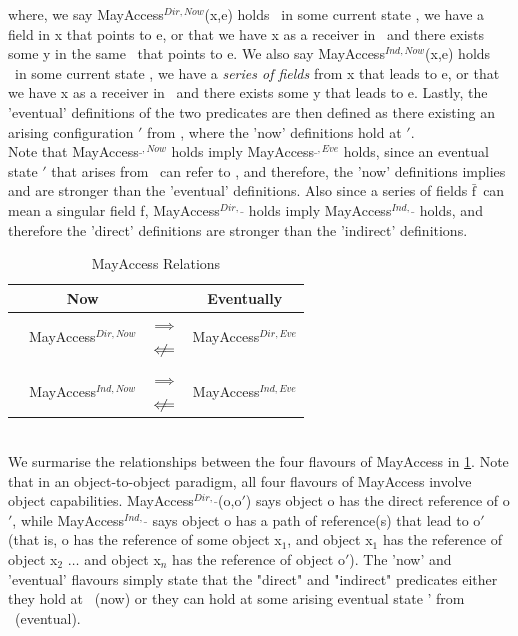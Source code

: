 \documentclass[a4paper,11pt,twoside]{article}
\newcommand*\rot{\rotatebox{90}}
\newcommand{\loimplies}{$\implies$}
\newcommand{\lonimplies}{$\centernot\implies$}
\newcommand{\loimpliedby}{$\Longleftarrow$}
\newcommand{\lonimpliedby}{$\centernot\Longleftarrow$}
\newcommand{\losigma}{\text{$\upsigma$}}
\newcommand{\loconj}[1] {$\bar{\text{#1}}$}
\newcommand{\lotiff} {\textit{\textls[-20]{iff}}}
\begin{document}
where, we say MayAccess$^{Dir,Now}$(x,e) holds \lotiff\ in some current state \losigma, we have a field in x that points to e, or that we have x as a receiver in \losigma\ and there exists some y in the same \losigma\ that points to e. We also say MayAccess$^{Ind,Now}$(x,e) holds \lotiff\ in some current state \losigma, we have a \textit{series of fields} from x that leads to e, or that we have x as a receiver in \losigma\ and there exists some y that leads to e. Lastly, the 'eventual' definitions of the two predicates are then defined as there existing an arising configuration \losigma$'$ from \losigma, where the 'now' definitions hold at \losigma$'$.\\

Note that MayAccess$^{\_,Now}$ holds imply MayAccess$^{\_,Eve}$ holds, since an eventual state \losigma$'$ that arises from \losigma\, can refer to \losigma, and therefore, the 'now' definitions implies and are stronger than the 'eventual' definitions. Also since a series of fields \loconj{f}\ can mean a singular field f, MayAccess$^{Dir,\_}$ holds imply MayAccess$^{Ind,\_}$ holds, and therefore the 'direct' definitions are stronger than the 'indirect' definitions. \\
\begin{table}[htb]
\caption{MayAccess Relations}\label{tab:accessrelations}
\centering
\begin{tabular*}{0.5\linewidth}{c|ccc}\toprule
& \bf Now & & \bf Eventually\\
\hline
\multirow{5}{*}{\rot{\bf Indirect \enspace Direct \:}} & \multirow{2}{*}{MayAccess$^{Dir,Now}$} & \loimplies & \multirow{2}{*}{MayAccess$^{Dir, Eve}$} \\
& & \lonimpliedby &  \\
& \rot{\loimpliedby} \rot{\lonimplies}& &\rot{\loimpliedby} \rot{\lonimplies} \\
& \multirow{2}{*}{MayAccess$^{Ind,Now}$} & \loimplies & \multirow{2}{*}{MayAccess$^{Ind, Eve}$} \\
& & \lonimpliedby &\\
\end{tabular*}
\end{table}\\
We surmarise the relationships between the four flavours of MayAccess in \cref{tab:accessrelations}. Note that in an object-to-object paradigm, all four flavours of MayAccess involve object capabilities. MayAccess$^{Dir,\_}$(o,o$'$) says object o has the direct reference of o$'$, while MayAccess$^{Ind,\_}$ says object o has a path of reference(s) that lead to o$'$ (that is, o has the reference of some object x$_1$, and object x$_1$ has the reference of object x$_2$ $\dots$ and object x$_n$ has the reference of object o$'$). The 'now' and 'eventual' flavours simply state that the "direct" and "indirect" predicates either they hold at \losigma\ (now) or they can hold at some arising eventual state \losigma' from \losigma\ (eventual).
\end{document}
